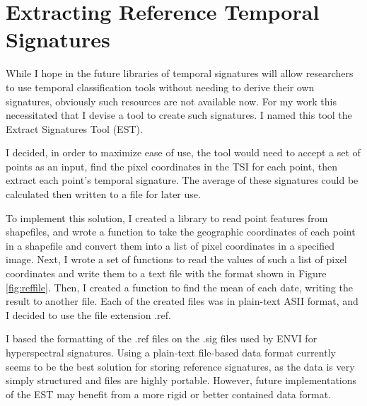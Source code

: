 \section{Extracting Reference Temporal Signatures}
\label{appendix:tools:extract}

While I hope in the future libraries of temporal signatures will allow researchers to use temporal classification tools without needing to derive their own signatures, obviously such resources are not available now. For my work this necessitated that I devise a tool to create such signatures. I named this tool the Extract Signatures Tool (EST).

I decided, in order to maximize ease of use, the tool would need to accept a set of points as an input, find the pixel coordinates in the TSI for each point, then extract each point’s temporal signature. The average of these signatures could be calculated then written to a file for later use.

To implement this solution, I created a library to read point features from shapefiles, and wrote a function to take the geographic coordinates of each point in a shapefile and convert them into a list of pixel coordinates in a specified image. Next, I wrote a set of functions to read the values of such a list of pixel coordinates and write them to a text file with the format shown in Figure \ref{fig:reffile}. Then, I created a function to find the mean of each date, writing the result to another file. Each of the created files was in plain-text ASII format, and I decided to use the file extension .ref.

I based the formatting of the .ref files on the .sig files used by ENVI for hyperspectral signatures. Using a plain-text file-based data format currently seems to be the best solution for storing reference signatures, as the data is very simply structured and files are highly portable. However, future implementations of the EST may benefit from a more rigid or better contained data format.

